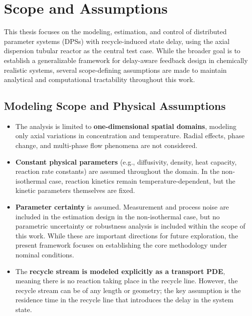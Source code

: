 \section{Scope and Assumptions}

This thesis focuses on the modeling, estimation, and control of distributed parameter systems (DPSs) with recycle-induced state delay, using the axial dispersion tubular reactor as the central test case. While the broader goal is to establish a generalizable framework for delay-aware feedback design in chemically realistic systems, several scope-defining assumptions are made to maintain analytical and computational tractability throughout this work.

\subsection*{Modeling Scope and Physical Assumptions}

\begin{itemize}
    \item The analysis is limited to \textbf{one-dimensional spatial domains}, modeling only axial variations in concentration and temperature. Radial effects, phase change, and multi-phase flow phenomena are not considered.

    \item \textbf{Constant physical parameters} (e.g., diffusivity, density, heat capacity, reaction rate constants) are assumed throughout the domain. In the non-isothermal case, reaction kinetics remain temperature-dependent, but the kinetic parameters themselves are fixed.

    \item \textbf{Parameter certainty} is assumed. Measurement and process noise are included in the estimation design in the non-isothermal case, but no parametric uncertainty or robustness analysis is included within the scope of this work. While these are important directions for future exploration, the present framework focuses on establishing the core methodology under nominal conditions.

    \item The \textbf{recycle stream is modeled explicitly as a transport PDE}, meaning there is no reaction taking place in the recycle line. However, the recycle stream can be of any length or geometry; the key assumption is the residence time in the recycle line that introduces the delay in the system state.
\end{itemize}

